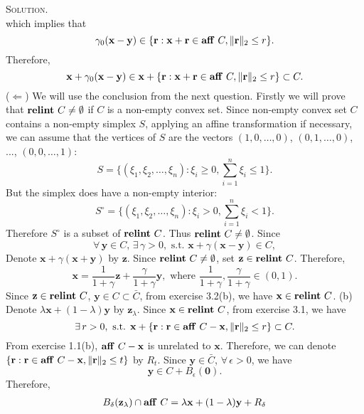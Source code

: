 \documentclass[12pt, a4paper, oneside]{ctexart}
\newenvironment{solution}{\par\noindent\textsc{Solution. }}{\\\par}
\DeclareMathOperator*{\relint}{\bf relint\,}
\DeclareMathOperator*{\aff}{\bf aff\,}
\begin{document}
\begin{solution}
\[	\]
	which implies that
	\[
	\gamma_0 (\mathbf{x} - \mathbf{y}) \in \{\mathbf{r} : \mathbf{x} + \mathbf{r} \in \aff C, \|\mathbf{r}\|_2 \leq r\}.
	\]
	Therefore, 
	\[
	\mathbf{x} + \gamma_0 (\mathbf{x} - \mathbf{y}) \in \mathbf{x} + \{\mathbf{r} : \mathbf{x} + \mathbf{r} \in \aff C, \|\mathbf{r}\|_2 \leq r\} \subset C.
	\]
	($\Leftarrow$) We will use the conclusion from the next question.
	\newline
	Firstly we will prove that $\relint C \neq \emptyset$ if $C$ is a non-empty convex set. Since non-empty convex set $C$ contains a non-empty simplex $S$, applying an affine transformation if necessary, we can assume that the vertices of $S$ are the vectors $(1, 0, \dots, 0)$, $(0, 1, \dots, 0)$, ..., $(0, 0, \dots, 1)$:
	\[
	S = \{(\xi_1, \xi_2, \dots, \xi_n): \xi_i \geq 0, \sum_{i = 1}^{n}\xi_i \leq 1\}.
	\]
	But the simplex does have a non-empty interior:
	\[
	S^\circ = \{(\xi_1, \xi_2, \dots, \xi_n): \xi_i > 0, \sum_{i = 1}^{n}\xi_i < 1\}.
	\]
	Therefore $S^\circ$ is a subset of $\relint C$. Thus $\relint C \neq \emptyset$.
	\newline
	Since 
	\[
	\forall\, \mathbf{y} \in C,\, \exists\, \gamma > 0, \text{ s.t. } \mathbf{x} + \gamma (\mathbf{x} - \mathbf{y}) \in C,
	\]
	Denote $\mathbf{x} + \gamma (\mathbf{x} + \mathbf{y})$ by $\mathbf{z}$. 
	Since $\relint C \neq \emptyset$, set $\mathbf{z} \in \relint C$. Therefore, 
	\[
	\mathbf{x} = \frac{1}{1 + \gamma} \mathbf{z} + \frac{\gamma}{1 + \gamma} \mathbf{y}, \text{ where } \frac{1}{1 + \gamma}, \frac{\gamma}{1 + \gamma} \in (0, 1).
	\]
	Since $\mathbf{z} \in \relint C$, $\mathbf{y} \in C \subset \bar{C}$, from exercise 3.2(b), we have $\mathbf{x} \in \relint C$.
	\newline\newline
	(b) Denote $\lambda \mathbf{x} + (1 - \lambda) \mathbf{y}$ by $\mathbf{z}_\lambda$. Since $\mathbf{x} \in \relint C$, from exercise 3.1, we have
	\[
	\exists\, r > 0, \text{ s.t. } \mathbf{x} + \{\mathbf{r} : \mathbf{r} \in \aff C - \mathbf{x}, \|\mathbf{r}\|_2 \leq r\} \subset C.
	\]
	From exercise 1.1(b), $\aff C - \mathbf{x}$ is unrelated to $\mathbf{x}$. Therefore, we can denote $\{\mathbf{r} : \mathbf{r} \in \aff C - \mathbf{x}, \|\mathbf{r}\|_2 \leq t\}$ by $R_t$.
	\newline
	Since $\mathbf{y} \in \bar{C}$, $\forall\, \epsilon > 0$, we have
	\[
	\mathbf{y} \in C + B_\epsilon(\mathbf{0}).
	\]
	Therefore,
	\begin{align*}
		B_\delta(\mathbf{z}_\lambda) \cap \aff C 
		& = \lambda \mathbf{x} + (1 - \lambda) \mathbf{y} + R_\delta \\

\end{align*}
\end{solution}
\end{document}
